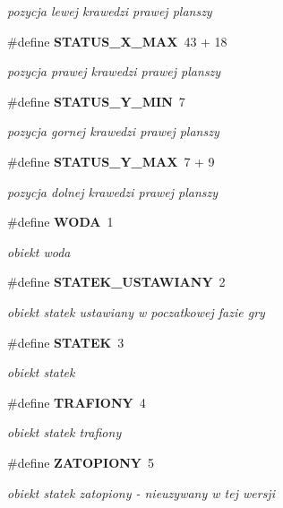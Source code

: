 \begin{DoxyCompactItemize}
\begin{DoxyCompactList}\small\item\em pozycja lewej krawedzi prawej planszy \end{DoxyCompactList}\item 
\#define \textbf{ S\+T\+A\+T\+U\+S\+\_\+\+X\+\_\+\+M\+AX}~43 + 18
\begin{DoxyCompactList}\small\item\em pozycja prawej krawedzi prawej planszy \end{DoxyCompactList}\item 
\#define \textbf{ S\+T\+A\+T\+U\+S\+\_\+\+Y\+\_\+\+M\+IN}~7
\begin{DoxyCompactList}\small\item\em pozycja gornej krawedzi prawej planszy \end{DoxyCompactList}\item 
\#define \textbf{ S\+T\+A\+T\+U\+S\+\_\+\+Y\+\_\+\+M\+AX}~7 + 9
\begin{DoxyCompactList}\small\item\em pozycja dolnej krawedzi prawej planszy \end{DoxyCompactList}\item 
\#define \textbf{ W\+O\+DA}~1
\begin{DoxyCompactList}\small\item\em obiekt woda \end{DoxyCompactList}\item 
\#define \textbf{ S\+T\+A\+T\+E\+K\+\_\+\+U\+S\+T\+A\+W\+I\+A\+NY}~2
\begin{DoxyCompactList}\small\item\em obiekt statek ustawiany w poczatkowej fazie gry \end{DoxyCompactList}\item 
\#define \textbf{ S\+T\+A\+T\+EK}~3
\begin{DoxyCompactList}\small\item\em obiekt statek \end{DoxyCompactList}\item 
\#define \textbf{ T\+R\+A\+F\+I\+O\+NY}~4
\begin{DoxyCompactList}\small\item\em obiekt statek trafiony \end{DoxyCompactList}\item 
\#define \textbf{ Z\+A\+T\+O\+P\+I\+O\+NY}~5
\begin{DoxyCompactList}\small\item\em obiekt statek zatopiony -\/ nieuzywany w tej wersji \end{DoxyCompactList}\item 

\end{DoxyCompactItemize}
